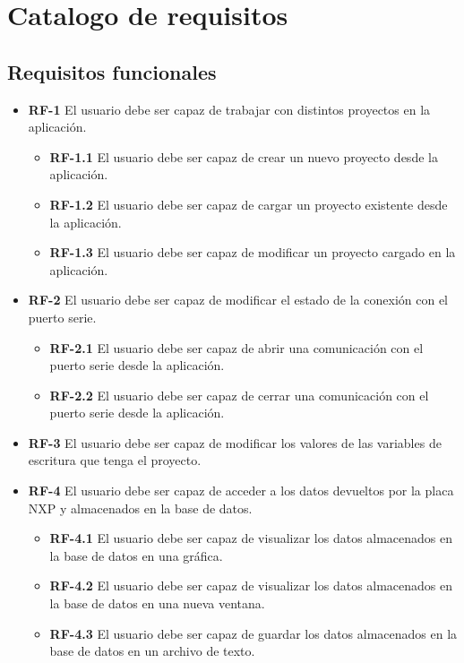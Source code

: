 \section{Catalogo de requisitos}

\subsection{Requisitos funcionales}

\begin{itemize}
	\item \textbf{RF-1} El usuario debe ser capaz de trabajar con distintos proyectos en la aplicación.
	\begin{itemize}
		\item \textbf{RF-1.1} El usuario debe ser capaz de crear un nuevo proyecto desde la aplicación.
		\item \textbf{RF-1.2} El usuario debe ser capaz de cargar un proyecto existente desde la aplicación.
		\item \textbf{RF-1.3} El usuario debe ser capaz de modificar un proyecto cargado en la aplicación.	
	\end{itemize}
	\item \textbf{RF-2} El usuario debe ser capaz de modificar el estado de la conexión con el puerto serie.
	\begin{itemize}
		\item \textbf{RF-2.1} El usuario debe ser capaz de abrir una comunicación con el puerto serie desde la aplicación.
		\item \textbf{RF-2.2} El usuario debe ser capaz de cerrar una comunicación con el puerto serie desde la aplicación.
	\end{itemize}
	\item \textbf{RF-3} El usuario debe ser capaz de modificar los valores de las variables de escritura que tenga el proyecto.
	\item \textbf{RF-4} El usuario debe ser capaz de acceder a los datos devueltos por la placa NXP y almacenados en la base de datos.
	\begin{itemize}
		\item \textbf{RF-4.1} El usuario debe ser capaz de visualizar los datos almacenados en la base de datos en una gráfica.
		\item \textbf{RF-4.2} El usuario debe ser capaz de visualizar los datos almacenados en la base de datos en una nueva ventana.
		\item \textbf{RF-4.3} El usuario debe ser capaz de guardar los datos almacenados en la base de datos en un archivo de texto.
	\end{itemize}
	
\end{itemize}

